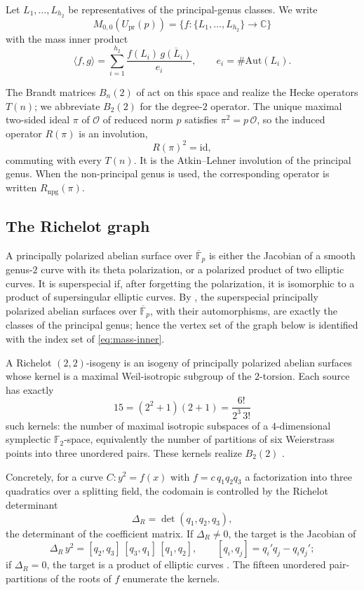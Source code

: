 \documentclass[10pt,a4paper]{amsart}
\newcommand{\F}{\mathbb{F}}
\newcommand{\C}{\mathbb{C}}
\newcommand{\Aut}{\mathrm{Aut}}
\newcommand{\Upr}{U_{\mathrm{pr}}}
\newcommand{\Onorm}{\mathcal{O}}
\providecommand{\Upr}{U_{\mathrm{pr}}}
\begin{document}
	Let $L_1,\ldots,L_{h_2}$ be representatives of the principal-genus classes.
	We write
	\[
	M_{0,0}(\Upr(p))=\{f:\{L_1,\ldots,L_{h_2}\}\to\C\}
	\]
	with the mass inner product
	\begin{equation}\label{eq:mass-inner}
		\langle f,g\rangle
		=\sum_{i=1}^{h_2}\frac{f(L_i)\,\overline{g(L_i)}}{e_i},
		\qquad e_i=\#\Aut(L_i).
	\end{equation}
	
	The Brandt matrices $B_n(2)$ of \cite{Hashimoto1980} act on this space and
	realize the Hecke operators $T(n)$; we abbreviate $B_2(2)$ for the
	degree-$2$ operator. The unique maximal two-sided ideal $\pi$ of $\Onorm$
	of reduced norm $p$ satisfies $\pi^2=p\,\Onorm$, so the induced operator
	$R(\pi)$ is an involution,
	\[
	R(\pi)^2=\mathrm{id},
	\]
	commuting with every $T(n)$. It is the Atkin--Lehner involution of the
	principal genus. When the non-principal genus is used, the corresponding
	operator is written $R_{\mathrm{npg}}(\pi)$.
	
	\subsection{The Richelot graph}
	\label{ss:richelot-graph}
	
	A principally polarized abelian surface over $\overline{\F}_p$ is either
	the Jacobian of a smooth genus-$2$ curve with its theta polarization, or a
	polarized product of two elliptic curves. It is superspecial if, after
	forgetting the polarization, it is isomorphic to a product of supersingular
	elliptic curves. By \cite[\S1]{IKO1986}, the superspecial principally
	polarized abelian surfaces over $\overline{\F}_p$, with their
	automorphisms, are exactly the classes of the principal genus; hence the
	vertex set of the graph below is identified with the index set of
	\eqref{eq:mass-inner}.
	
	A Richelot $(2,2)$-isogeny is an isogeny of principally polarized abelian
	surfaces whose kernel is a maximal Weil-isotropic subgroup of the
	$2$-torsion. Each source has exactly
	\begin{equation}\label{eq:fifteen}
		15=(2^2+1)(2+1)=\frac{6!}{2^3\,3!}
	\end{equation}
	such kernels: the number of maximal isotropic subspaces of a
	$4$-dimensional symplectic $\F_2$-space, equivalently the number of
	partitions of six Weierstrass points into three unordered pairs. These
	kernels realize $B_2(2)$ \cite{KatsuraTakashima}.
	
	Concretely, for a curve $C:y^2=f(x)$ with $f=c\,q_1q_2q_3$ a factorization
	into three quadratics over a splitting field, the codomain is controlled by
	the Richelot determinant
	\[
	\Delta_R=\det(q_1,q_2,q_3),
	\]
	the determinant of the coefficient matrix. If $\Delta_R\ne0$, the target is
	the Jacobian of
	\[
	\Delta_R\,y^2=[q_2,q_3]\,[q_3,q_1]\,[q_1,q_2],
	\qquad [q_i,q_j]=q_i'q_j-q_iq_j';
	\]
	if $\Delta_R=0$, the target is a product of elliptic curves
	\cite[\S8]{JordanZaytman}. The fifteen unordered pair-partitions of the
	roots of $f$ enumerate the kernels.
	
\end{document}
